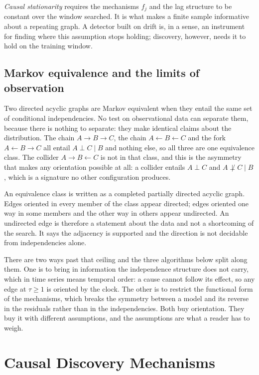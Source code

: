 \emph{Causal stationarity} requires the mechanisms $f_j$ and the lag structure to be constant over the window searched. It is what makes a finite sample informative about a repeating graph. A detector built on drift is, in a sense, an instrument for finding where this assumption stops holding; discovery, however, needs it to hold on the training window.

\subsection{Markov equivalence and the limits of observation}
\label{sec:bg-equivalence}

Two directed acyclic graphs are Markov equivalent when they entail the same set of conditional independencies. No test on observational data can separate them, because there is nothing to separate: they make identical claims about the distribution. The chain $A \to B \to C$, the chain $A \leftarrow B \leftarrow C$ and the fork $A \leftarrow B \to C$ all entail $A \perp C \mid B$ and nothing else, so all three are one equivalence class. The collider $A \to B \leftarrow C$ is not in that class, and this is the asymmetry that makes any orientation possible at all: a collider entails $A \perp C$ and $A \not\perp C \mid B$, which is a signature no other configuration produces.

An equivalence class is written as a completed partially directed acyclic graph. Edges oriented in every member of the class appear directed; edges oriented one way in some members and the other way in others appear undirected. An undirected edge is therefore a statement about the data and not a shortcoming of the search. It says the adjacency is supported and the direction is not decidable from independencies alone.

There are two ways past that ceiling and the three algorithms below split along them. One is to bring in information the independence structure does not carry, which in time series means temporal order: a cause cannot follow its effect, so any edge at $\tau \ge 1$ is oriented by the clock. The other is to restrict the functional form of the mechanisms, which breaks the symmetry between a model and its reverse in the residuals rather than in the independencies. Both buy orientation. They buy it with different assumptions, and the assumptions are what a reader has to weigh.

\section{Causal Discovery Mechanisms}
\label{sec:bg-discovery}

